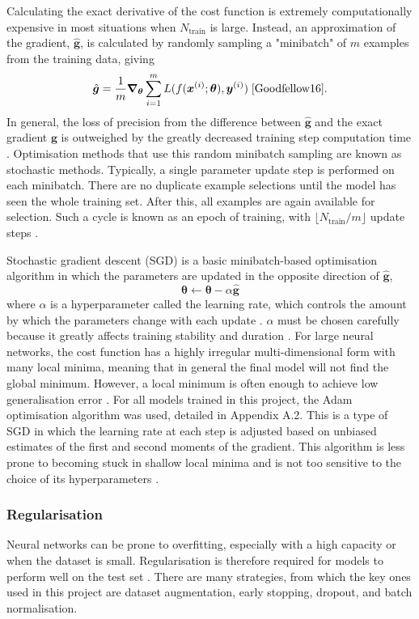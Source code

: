 \documentclass[12pt]{article}
\begin{document}
Calculating the exact derivative of the cost function is extremely computationally expensive in most situations when $N_{\mathrm{train}}$ is large. Instead, an approximation of the gradient, $\hat{\bm{g}}$, is calculated by randomly sampling a "minibatch" of $m$ examples from the training data, giving
\begin{equation}
\label{BatchGrad}
\hat{\bm{g}}=\frac{1}{m}\bm\nabla_{\bm\theta}\sum_{i=1}^mL(f(\bm{x}^{(i)};\bm\theta),\bm{y}^{(i)})\;\cite{Goodfellow16}.
\end{equation}
In general, the loss of precision from the difference between $\hat{\bm{g}}$ and the exact gradient $\bm{g}$ is outweighed by the greatly decreased training step computation time \cite{Goodfellow16}. Optimisation methods that use this random minibatch sampling are known as stochastic methods. Typically, a single parameter update step is performed on each minibatch. There are no duplicate example selections until the model has seen the whole training set. After this, all examples are again available for selection. Such a cycle is known as an epoch of training, with $\lfloor N_{\mathrm{train}}/m\rfloor$ update steps \cite{Goodfellow16}.

Stochastic gradient descent (SGD) is a basic minibatch-based optimisation algorithm in which the parameters are updated in the opposite direction of $\hat{\bm{g}}$,
\begin{equation}
\bm\theta\leftarrow\bm\theta-\alpha\hat{\bm{g}}
\end{equation}
where $\alpha$ is a hyperparameter called the learning rate, which controls the amount by which the parameters change with each update \cite{Amari93}. $\alpha$ must be chosen carefully because it greatly affects training stability and duration \cite{Goodfellow16}. For large neural networks, the cost function has a highly irregular multi-dimensional form with many local minima, meaning that in general the final model will not find the global minimum. However, a local minimum is often enough to achieve low generalisation error \cite{Goodfellow16}. For all models trained in this project, the Adam optimisation algorithm was used, detailed in Appendix A.2. This is a type of SGD in which the learning rate at each step is adjusted based on unbiased estimates of the first and second moments of the gradient. This algorithm is less prone to becoming stuck in shallow local minima and is not too sensitive to the choice of its hyperparameters \cite{Kingma14}. 

\subsubsection{Regularisation}
Neural networks can be prone to overfitting, especially with a high capacity or when the dataset is small. Regularisation is therefore required for models to perform well on the test set \cite{Goodfellow16}. There are many strategies, from which the key ones used in this project are dataset augmentation, early stopping, dropout, and batch normalisation.
\end{document}
